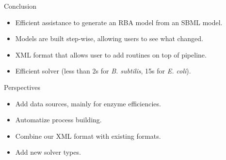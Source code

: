 \documentclass{beamer}
\begin{document}
\begin{frame}{Conclusion}
  \begin{itemize}
    \item Efficient assistance to generate an RBA model from an SBML model.
    \item Models are built step-wise, allowing users to see what changed.
    \item XML format that allows user to add routines on top of pipeline.
    \item Efficient solver
    (less than 2s for \textit{B. subtilis}, 15s for \textit{E. coli}).
  \end{itemize}
\end{frame}

\begin{frame}{Perspectives}
  \begin{itemize}
    \item Add data sources, mainly for enzyme efficiencies.
    \item Automatize process building.
    \item Combine our XML format with existing formats.
    \item Add new solver types.
  \end{itemize}
\end{frame}


\appendix
{}
\setcounter{finalframe}{\value{framenumber}}


\setcounter{framenumber}{\value{finalframe}}
\end{document}
